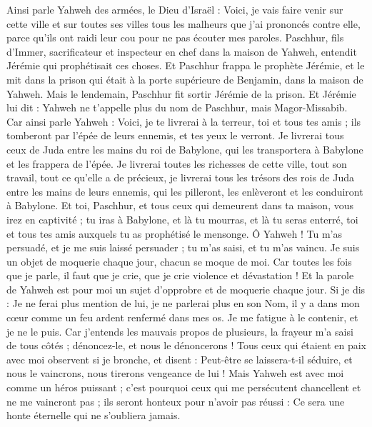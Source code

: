 \begin{multicols}{2}
Ainsi parle Yahweh des armées, le Dieu d'Israël : Voici, je vais faire venir sur cette ville et sur toutes ses villes tous les malheurs que j'ai prononcés contre elle, parce qu'ils ont raidi leur cou pour ne pas écouter mes paroles.
\VerseOne{}Paschhur, fils d'Immer, sacrificateur et inspecteur en chef dans la maison de Yahweh, entendit Jérémie qui prophétisait ces choses.
Et Paschhur frappa le prophète Jérémie, et le mit dans la prison qui était à la porte supérieure de Benjamin, dans la maison de Yahweh.
Mais le lendemain, Paschhur fit sortir Jérémie de la prison. Et Jérémie lui dit : Yahweh ne t’appelle plus du nom de Paschhur, mais Magor-Missabib.
Car ainsi parle Yahweh : Voici, je te livrerai à la terreur, toi et tous tes amis ; ils tomberont par l'épée de leurs ennemis, et tes yeux le verront. Je livrerai tous ceux de Juda entre les mains du roi de Babylone, qui les transportera à Babylone et les frappera de l'épée.
Je livrerai toutes les richesses de cette ville, tout son travail, tout ce qu'elle a de précieux, je livrerai tous les trésors des rois de Juda entre les mains de leurs ennemis, qui les pilleront, les enlèveront et les conduiront à Babylone.
Et toi, Paschhur, et tous ceux qui demeurent dans ta maison, vous irez en captivité ; tu iras à Babylone, et là tu mourras, et là tu seras enterré, toi et tous tes amis auxquels tu as prophétisé le mensonge.
Ô Yahweh ! Tu m'as persuadé, et je me suis laissé persuader ; tu m’as saisi, et tu m’as vaincu. Je suis un objet de moquerie chaque jour, chacun se moque de moi.
Car toutes les fois que je parle, il faut que je crie, que je crie violence et dévastation ! Et la parole de Yahweh est pour moi un sujet d’opprobre et de moquerie chaque jour.
Si je dis : Je ne ferai plus mention de lui, je ne parlerai plus en son Nom, il y a dans mon cœur comme un feu ardent renfermé dans mes os. Je me fatigue à le contenir, et je ne le puis.
Car j'entends les mauvais propos de plusieurs, la frayeur m’a saisi de tous côtés ; dénoncez-le, et nous le dénoncerons ! Tous ceux qui étaient en paix avec moi observent si je bronche, et disent : Peut-être se laissera-t-il séduire, et nous le vaincrons, nous tirerons vengeance de lui !
Mais Yahweh est avec moi comme un héros puissant ; c'est pourquoi ceux qui me persécutent chancellent et ne me vaincront pas ; ils seront honteux pour n’avoir pas réussi : Ce sera une honte éternelle qui ne s'oubliera jamais.

\end{multicols}
